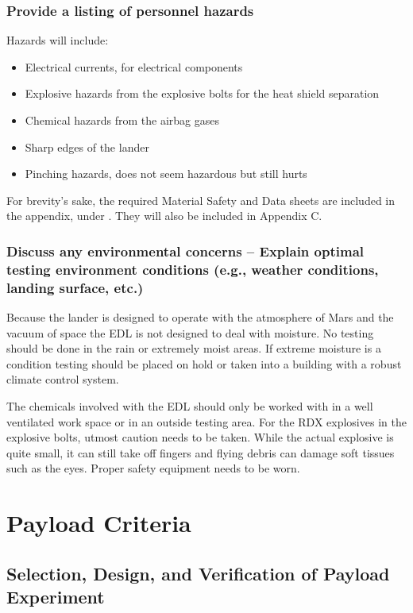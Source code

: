 \documentclass[%
 portrait,
 aapm,
 mph,%
 amsmath,amssymb,
 reprint,%
]{revtex4-2}
\begin{document}
\subsubsection{Provide a listing of personnel hazards}
Hazards will include: 
\begin{itemize}
    \item Electrical currents, for electrical components
    \item Explosive hazards from the explosive bolts for the heat shield separation
    \item Chemical hazards from the airbag gases
    \item Sharp edges of the lander
    \item Pinching hazards, does not seem hazardous but still hurts
\end{itemize}
For brevity's sake, the required Material Safety and Data sheets are included in the appendix, under \cite{fisher_scientific_2014, new_jersey_department_of_health_2013, fisher_scientific_2014_001, nuplex_2013}. They will also be included in Appendix C.

\subsubsection{Discuss any environmental concerns – Explain optimal testing
environment conditions (e.g., weather conditions, landing surface, etc.)}
Because the lander is designed to operate with the atmosphere of Mars and the vacuum of space the EDL is not designed to deal with moisture.  No testing should be done in the rain or extremely moist areas.  If  extreme moisture is a condition testing should be placed on hold or taken into a building with a robust climate control system.

The chemicals involved with the EDL should only be worked with in a well ventilated work space or in an outside testing area.  For the RDX explosives in the explosive bolts, utmost caution needs to be taken.  While the actual explosive is quite small, it can still take off fingers and flying debris can damage soft tissues such as the eyes.  Proper safety equipment needs to be worn.


\section{\label{sec:level5}Payload Criteria}

\subsection{Selection, Design, and Verification of Payload Experiment}
\end{document}
